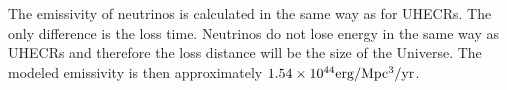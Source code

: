 The emissivity of neutrinos is calculated in the same way as for UHECRs. The only difference is the loss time. Neutrinos do not lose energy in the same way as UHECRs and therefore the loss distance will be the size of the Universe. 
The modeled emissivity is then approximately $1.54 \times 10^{44} \rm erg/Mpc^3/yr$. 

